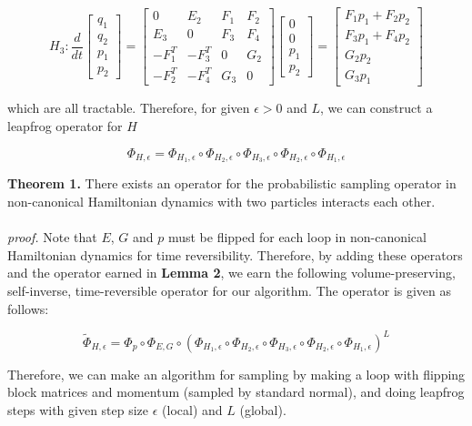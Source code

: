 \documentclass{article}
\begin{document}
\[
H_3 : \frac{d}{dt}
\left[
\begin{array}{ccc}
q_1 \\
q_2 \\
p_1 \\
p_2 
\end{array}
\right]
=
\left[
\begin{array}{cclcc}
0 & E_{2} & F_{1} & F_{2} \\
E_3 & 0& F_3 & F_4 \\
-F_1^T & -F_3^T & 0 & G_2 \\
-F_2^T & -F_4^T & G_3 & 0 
\end{array}
\right]
\left[
\begin{array}{ccc}
0\\
0  \\
p_1 \\
p_2
\end{array}
\right]
=
\left[
\begin{array}{ccc}
F_1 p_1 + F_2 p_2  \\
F_3 p_1 + F_4 p_2  \\
G_2 p_2 \\
G_3 p_1 
\end{array}
\right]
\] 

which are all tractable. Therefore, for given $\epsilon > 0$ and $L$, we can construct a leapfrog operator for $H$

$$\displaystyle\Phi_{H,\epsilon} = \Phi_{H_1,\epsilon} \circ \Phi_{H_2,\epsilon} \circ \Phi_{H_3,\epsilon} \circ \Phi_{H_2,\epsilon} \circ \Phi_{H_1,\epsilon}$$


\noindent \textbf{Theorem 1.} There exists an operator for the probabilistic sampling operator in non-canonical Hamiltonian dynamics with two particles interacts each other.   
\\
\\
\textit{proof.} Note that $E$, $G$ and $p$ must be flipped for each loop in non-canonical Hamiltonian dynamics for time reversibility. Therefore, by adding these operators and the operator earned in \textbf{Lemma 2}, we earn the following volume-preserving, self-inverse, time-reversible operator for our algorithm. The operator is given as follows:

$$\displaystyle\tilde{\Phi}_{H,\epsilon} = \Phi_{p} \circ \Phi_{E,G} \circ (\Phi_{H_1,\epsilon} \circ \Phi_{H_2,\epsilon} \circ \Phi_{H_3,\epsilon} \circ \Phi_{H_2,\epsilon} \circ \Phi_{H_1,\epsilon})^L$$

Therefore, we can make an algorithm for sampling by making a loop with flipping block matrices and momentum (sampled by standard normal), and doing leapfrog steps with given step size $\epsilon$ (local) and $L$ (global). 
\end{document}

